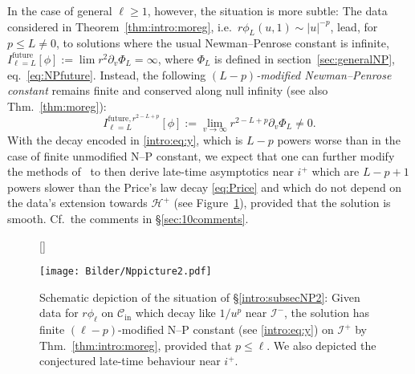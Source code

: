 \documentclass[11pt,english]{article}
\numberwithin{equation}{section}
\theoremstyle{remark}
\theoremstyle{plain}
\theoremstyle{remark}
\newcommand{\pv}{\partial_v}
\renewcommand{\(}{\left(}
\renewcommand{\)}{\right)}
\begin{document}
In the case of general $\ell\geq 1$, however, the situation is more subtle: 
The data considered in Theorem~\ref{thm:intro:moreg}, i.e.\ $r\phi_L(u,1)\sim |u|^{-p}$, lead, for $p\leq L\neq 0$, to solutions where the usual Newman--Penrose constant is infinite, $I_{\ell=L}^\mathrm{future}[\phi]:=\lim r^2\pv\Phi_L=\infty$, where $\Phi_L$ is defined in section~\ref{sec:generalNP}, eq.\ \eqref{eq:NPfuture}. 
Instead, the following \textit{$(L-p)$-modified Newman--Penrose constant} remains finite and conserved along null infinity (see also Thm.~\ref{thm:moreg}):
\begin{equation}\label{intro:eq:y}
I_{\ell=L}^{\mathrm{future},r^{2-L+p}}[\phi]:=\lim_{v\to\infty} r^{2-L+p}\pv\Phi_L\neq 0.
\end{equation}
With the decay encoded in \eqref{intro:eq:y}, which is $L-p$ powers worse than in the case of finite unmodified N--P constant, we expect that one can further modify the methods of~\cite{AAG21} to then derive late-time asymptotics near $i^+$ which are $L-p+1$ powers slower than the Price's law decay \eqref{eq:Price} and which do not depend on the data's extension towards $\mathcal H^+$ (see Figure~\ref{fig:III:2}), provided that the solution is smooth. Cf.\ the comments in \S\ref{sec:10comments}.
\begin{figure}[htbp]
[\FBwidth]
{\caption{Schematic depiction of the situation of \S \ref{intro:subsecNP2}: Given data for $r\phi_\ell$ on $\mathcal C_{\mathrm{in}
}$ which decay like $1/u^p$ near $\mathcal I^-$, the solution has finite $(\ell-p)$-modified N--P constant (see \eqref{intro:eq:y}) on $\mathcal I^+$ by Thm.~\ref{thm:intro:moreg}, provided that $p\leq \ell$. We also depicted the conjectured late-time behaviour near $i^+$.}\label{fig:III:2}}
{\texttt{[image: Bilder/Nppicture2.pdf]}}
\end{figure}
\end{document}
